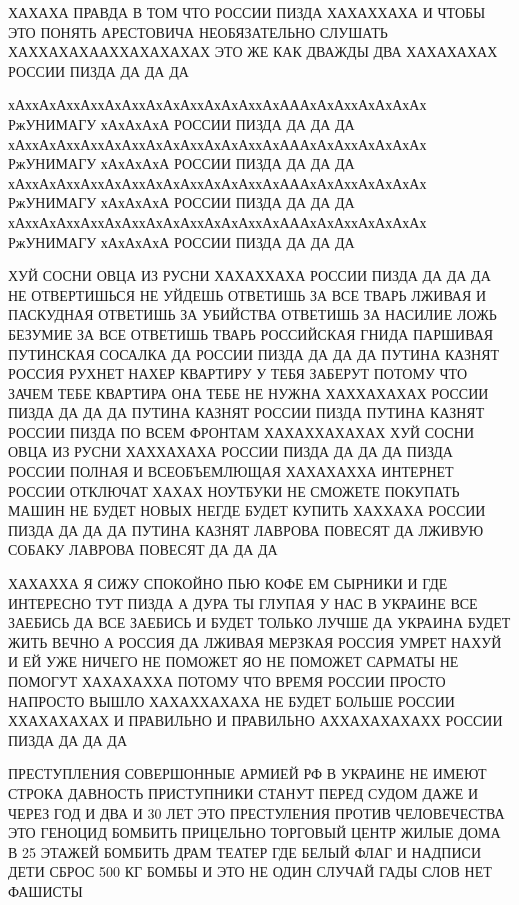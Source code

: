  
 
 
 


ХАХАХА ПРАВДА В ТОМ ЧТО РОССИИ ПИЗДА ХАХАХХАХА И ЧТОБЫ ЭТО ПОНЯТЬ АРЕСТОВИЧА
НЕОБЯЗАТЕЛЬНО СЛУШАТЬ ХАХХАХАХААХХАХАХАХАХ ЭТО ЖЕ КАК ДВАЖДЫ ДВА ХАХАХАХАХ
РОССИИ ПИЗДА ДА ДА ДА
 
хАххАхАххАххАхАххАхАхАххАхАхАххАхАААхАхАххАхАхАхАх
РжУНИМАГУ хАхАхАхА РОССИИ ПИЗДА ДА ДА ДА 
хАххАхАххАххАхАххАхАхАххАхАхАххАхАААхАхАххАхАхАхАх
РжУНИМАГУ хАхАхАхА РОССИИ ПИЗДА ДА ДА ДА 
хАххАхАххАххАхАххАхАхАххАхАхАххАхАААхАхАххАхАхАхАх
РжУНИМАГУ хАхАхАхА РОССИИ ПИЗДА ДА ДА ДА 
хАххАхАххАххАхАххАхАхАххАхАхАххАхАААхАхАххАхАхАхАх
РжУНИМАГУ хАхАхАхА РОССИИ ПИЗДА ДА ДА ДА 

ХУЙ СОСНИ ОВЦА ИЗ РУСНИ ХАХАХХАХА РОССИИ ПИЗДА ДА ДА ДА 
НЕ ОТВЕРТИШЬСЯ НЕ УЙДЕШЬ ОТВЕТИШЬ ЗА ВСЕ ТВАРЬ ЛЖИВАЯ И ПАСКУДНАЯ
ОТВЕТИШЬ ЗА УБИЙСТВА ОТВЕТИШЬ ЗА НАСИЛИЕ ЛОЖЬ БЕЗУМИЕ 
ЗА ВСЕ ОТВЕТИШЬ ТВАРЬ РОССИЙСКАЯ ГНИДА ПАРШИВАЯ ПУТИНСКАЯ СОСАЛКА
ДА РОССИИ ПИЗДА ДА ДА ДА ПУТИНА КАЗНЯТ РОССИЯ РУХНЕТ НАХЕР
КВАРТИРУ У ТЕБЯ ЗАБЕРУТ ПОТОМУ ЧТО ЗАЧЕМ ТЕБЕ КВАРТИРА 
ОНА ТЕБЕ НЕ НУЖНА ХАХХАХАХАХ РОССИИ ПИЗДА ДА ДА ДА
ПУТИНА КАЗНЯТ РОССИИ ПИЗДА ПУТИНА КАЗНЯТ РОССИИ ПИЗДА ПО ВСЕМ ФРОНТАМ
ХАХАХХАХАХАХ ХУЙ СОСНИ ОВЦА ИЗ РУСНИ ХАХХАХАХА РОССИИ ПИЗДА ДА ДА ДА 
ПИЗДА РОССИИ ПОЛНАЯ И ВСЕОБЪЕМЛЮЩАЯ ХАХАХАХХА ИНТЕРНЕТ РОССИИ ОТКЛЮЧАТ ХАХАХ
НОУТБУКИ НЕ СМОЖЕТЕ ПОКУПАТЬ МАШИН НЕ БУДЕТ НОВЫХ НЕГДЕ БУДЕТ КУПИТЬ ХАХХАХА
РОССИИ ПИЗДА ДА ДА ДА ПУТИНА КАЗНЯТ ЛАВРОВА ПОВЕСЯТ ДА ЛЖИВУЮ СОБАКУ ЛАВРОВА
ПОВЕСЯТ ДА ДА ДА

ХАХАХХА Я СИЖУ СПОКОЙНО ПЬЮ КОФЕ ЕМ СЫРНИКИ И ГДЕ ИНТЕРЕСНО ТУТ ПИЗДА А ДУРА ТЫ
ГЛУПАЯ У НАС В УКРАИНЕ ВСЕ ЗАЕБИСЬ ДА ВСЕ ЗАЕБИСЬ И БУДЕТ ТОЛЬКО ЛУЧШЕ ДА
УКРАИНА БУДЕТ ЖИТЬ ВЕЧНО А РОССИЯ ДА ЛЖИВАЯ МЕРЗКАЯ РОССИЯ УМРЕТ НАХУЙ И ЕЙ УЖЕ
НИЧЕГО НЕ ПОМОЖЕТ ЯО НЕ ПОМОЖЕТ САРМАТЫ НЕ ПОМОГУТ ХАХАХАХХА ПОТОМУ ЧТО ВРЕМЯ
РОССИИ ПРОСТО НАПРОСТО ВЫШЛО ХАХАХХАХАХА НЕ БУДЕТ БОЛЬШЕ РОССИИ ХХАХАХАХАХ И
ПРАВИЛЬНО И ПРАВИЛЬНО АХХАХАХАХАХХ РОССИИ ПИЗДА ДА ДА ДА

ПРЕСТУПЛЕНИЯ СОВЕРШОННЫЕ АРМИЕЙ РФ В УКРАИНЕ
НЕ ИМЕЮТ СТРОКА ДАВНОСТЬ
ПРИСТУПНИКИ СТАНУТ ПЕРЕД СУДОМ ДАЖЕ И ЧЕРЕЗ ГОД И ДВА И 30 ЛЕТ ЭТО ПРЕСТУЛЕНИЯ ПРОТИВ ЧЕЛОВЕЧЕСТВА ЭТО ГЕНОЦИД
БОМБИТЬ ПРИЦЕЛЬНО ТОРГОВЫЙ ЦЕНТР
ЖИЛЫЕ ДОМА В 25 ЭТАЖЕЙ
БОМБИТЬ ДРАМ ТЕАТЕР ГДЕ БЕЛЫЙ ФЛАГ И НАДПИСИ ДЕТИ
СБРОС 500 КГ БОМБЫ И ЭТО НЕ ОДИН СЛУЧАЙ
ГАДЫ СЛОВ НЕТ ФАШИСТЫ

